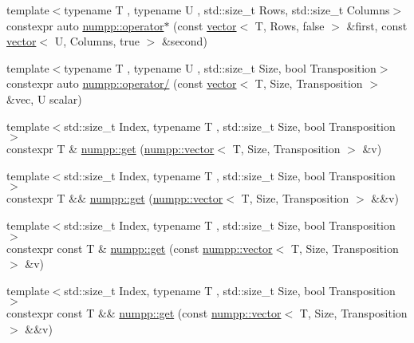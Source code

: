 \begin{DoxyCompactItemize}
\item 
{\footnotesize template$<$typename T , typename U , std\+::size\+\_\+t Rows, std\+::size\+\_\+t Columns$>$ }\\constexpr auto \hyperlink{group__numpp__structures__vector_ga79a0f32943f0dde6c938f804d132c42e}{numpp\+::operator$\ast$} (const \hyperlink{classnumpp_1_1vector}{vector}$<$ T, Rows, false $>$ \&first, const \hyperlink{classnumpp_1_1vector}{vector}$<$ U, Columns, true $>$ \&second)
\item 
{\footnotesize template$<$typename T , typename U , std\+::size\+\_\+t Size, bool Transposition$>$ }\\constexpr auto \hyperlink{group__numpp__structures__vector_ga5089883ef7a3d2a243647cb2cc543735}{numpp\+::operator/} (const \hyperlink{classnumpp_1_1vector}{vector}$<$ T, Size, Transposition $>$ \&vec, U scalar)
\item 
{\footnotesize template$<$std\+::size\+\_\+t Index, typename T , std\+::size\+\_\+t Size, bool Transposition$>$ }\\constexpr T \& \hyperlink{group__numpp__structures__vector_ga01dd4b7887091df5206acba15d280d48}{numpp\+::get} (\hyperlink{classnumpp_1_1vector}{numpp\+::vector}$<$ T, Size, Transposition $>$ \&v)
\item 
{\footnotesize template$<$std\+::size\+\_\+t Index, typename T , std\+::size\+\_\+t Size, bool Transposition$>$ }\\constexpr T \&\& \hyperlink{group__numpp__structures__vector_ga9172642419f215f74fbfe6616c8453b2}{numpp\+::get} (\hyperlink{classnumpp_1_1vector}{numpp\+::vector}$<$ T, Size, Transposition $>$ \&\&v)
\item 
{\footnotesize template$<$std\+::size\+\_\+t Index, typename T , std\+::size\+\_\+t Size, bool Transposition$>$ }\\constexpr const T \& \hyperlink{group__numpp__structures__vector_ga1a445b047ad3c94be0a15bf228bb5b5d}{numpp\+::get} (const \hyperlink{classnumpp_1_1vector}{numpp\+::vector}$<$ T, Size, Transposition $>$ \&v)
\item 
{\footnotesize template$<$std\+::size\+\_\+t Index, typename T , std\+::size\+\_\+t Size, bool Transposition$>$ }\\constexpr const T \&\& \hyperlink{group__numpp__structures__vector_ga492c948b84cb987e083a913814549e8a}{numpp\+::get} (const \hyperlink{classnumpp_1_1vector}{numpp\+::vector}$<$ T, Size, Transposition $>$ \&\&v)
\end{DoxyCompactItemize}


